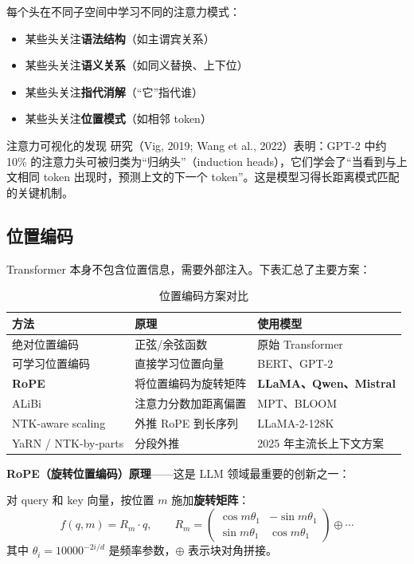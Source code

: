 \documentclass[12pt,a4paper]{article}
\begin{document}
每个头在不同子空间中学习不同的注意力模式：
\begin{itemize}
  \item 某些头关注\textbf{语法结构}（如主谓宾关系）
  \item 某些头关注\textbf{语义关系}（如同义替换、上下位）
  \item 某些头关注\textbf{指代消解}（“它”指代谁）
  \item 某些头关注\textbf{位置模式}（如相邻 token）
\end{itemize}

\begin{infobox}{注意力可视化的发现}
研究（Vig, 2019; Wang et al., 2022）表明：GPT-2 中约 10\% 的注意力头可被归类为“归纳头”（induction heads），它们学会了“当看到与上文相同 token 出现时，预测上文的下一个 token”。这是模型习得长距离模式匹配的关键机制。
\end{infobox}

\subsection{位置编码}
Transformer 本身不包含位置信息，需要外部注入。下表汇总了主要方案：

\begin{table}[htbp]
\centering
\small
\begin{tabular}{@{}lll@{}}
\toprule
\textbf{方法} & \textbf{原理} & \textbf{使用模型}\\
\midrule
绝对位置编码 & 正弦/余弦函数 & 原始 Transformer\\
可学习位置编码 & 直接学习位置向量 & BERT、GPT-2\\
\textbf{RoPE} & 将位置编码为旋转矩阵 & \textbf{LLaMA、Qwen、Mistral}\\
ALiBi & 注意力分数加距离偏置 & MPT、BLOOM\\
NTK-aware scaling & 外推 RoPE 到长序列 & LLaMA-2-128K\\
YaRN / NTK-by-parts & 分段外推 & 2025 年主流长上下文方案\\
\bottomrule
\end{tabular}
\caption{位置编码方案对比}
\end{table}

\textbf{RoPE（旋转位置编码）原理}——这是 LLM 领域最重要的创新之一：

对 query 和 key 向量，按位置 $m$ 施加\textbf{旋转矩阵}：
\[
f(q, m) = R_m \cdot q, \qquad
R_m = \begin{pmatrix}
\cos m\theta_1 & -\sin m\theta_1 \\
\sin m\theta_1 & \cos m\theta_1
\end{pmatrix} \oplus \cdots
\]
其中 $\theta_i = 10000^{-2i/d}$ 是频率参数，$\oplus$ 表示块对角拼接。
\end{document}

